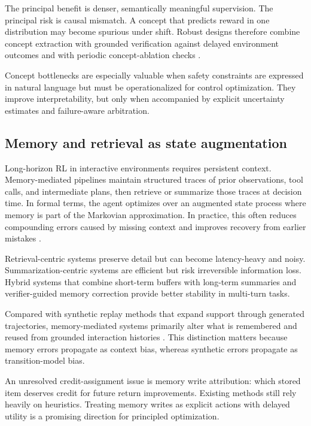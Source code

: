 \documentclass[pdflatex,sn-mathphys-num]{sn-jnl}
\begin{document}
The principal benefit is denser, semantically meaningful supervision. The principal risk is causal mismatch. A concept that predicts reward in one distribution may become spurious under shift. Robust designs therefore combine concept extraction with grounded verification against delayed environment outcomes and with periodic concept-ablation checks \cite{arxiv_p_2303_00001,arxiv_p_2309_06687,arxiv_p_2510_10197,arxiv_p_2601_15690}.

Concept bottlenecks are especially valuable when safety constraints are expressed in natural language but must be operationalized for control optimization. They improve interpretability, but only when accompanied by explicit uncertainty estimates and failure-aware arbitration.

\subsection{Memory and retrieval as state augmentation}
Long-horizon RL in interactive environments requires persistent context. Memory-mediated pipelines maintain structured traces of prior observations, tool calls, and intermediate plans, then retrieve or summarize those traces at decision time. In formal terms, the agent optimizes over an augmented state process where memory is part of the Markovian approximation. In practice, this often reduces compounding errors caused by missing context and improves recovery from earlier mistakes \cite{arxiv_p_2404_03648,arxiv_p_2511_14460,arxiv_p_2602_00994,arxiv_p_2601_07264}.

Retrieval-centric systems preserve detail but can become latency-heavy and noisy. Summarization-centric systems are efficient but risk irreversible information loss. Hybrid systems that combine short-term buffers with long-term summaries and verifier-guided memory correction provide better stability in multi-turn tasks.

Compared with synthetic replay methods that expand support through generated trajectories, memory-mediated systems primarily alter what is remembered and reused from grounded interaction histories \cite{arxiv_p_2601_08107,arxiv_p_2602_02137,arxiv_p_2602_03305}. This distinction matters because memory errors propagate as context bias, whereas synthetic errors propagate as transition-model bias.

An unresolved credit-assignment issue is memory write attribution: which stored item deserves credit for future return improvements. Existing methods still rely heavily on heuristics. Treating memory writes as explicit actions with delayed utility is a promising direction for principled optimization.
\end{document}
